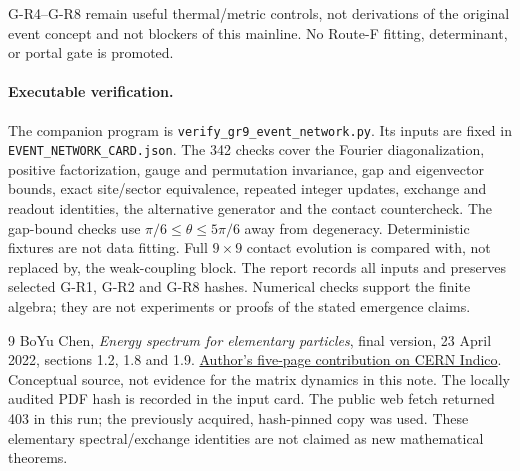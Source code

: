 \documentclass[11pt,a4paper]{article}
\begin{document}
G-R4--G-R8 remain useful thermal/metric controls, not derivations of
the original event concept and not blockers of this mainline. No
Route-F fitting, determinant, or portal gate is promoted.

\paragraph{Executable verification.}
The companion program is
\texttt{verify\_gr9\_event\_network.py}.
Its inputs are fixed in \texttt{EVENT\_NETWORK\_CARD.json}.
The 342 checks cover the Fourier
diagonalization, positive factorization, gauge and permutation invariance,
gap and eigenvector bounds, exact site/sector equivalence, repeated
integer updates, exchange and readout identities, the alternative
generator and the contact countercheck. The gap-bound checks use
$\pi/6\leq\theta\leq5\pi/6$ away from degeneracy. Deterministic fixtures are
not data fitting. Full $9\times9$ contact evolution is compared with,
not replaced by, the weak-coupling block. The report records all inputs
and preserves selected G-R1, G-R2 and G-R8 hashes. Numerical checks
support the finite algebra; they are not experiments or proofs of
the stated emergence claims.

\begin{thebibliography}{9}
 BoYu Chen, \emph{Energy spectrum for elementary particles},
final version, 23 April 2022, sections 1.2, 1.8 and 1.9.
\href{https://indico.cern.ch/event/1109513/contributions/4969967/attachments/2480973/4410560/Energy\%20spectrum\%20for\%20elementary\%20particles_final.pdf}{Author's five-page contribution on CERN Indico}.
Conceptual source, not evidence for the matrix dynamics in this note.
The locally audited PDF hash is recorded in the input card. The public
web fetch returned 403 in this run; the previously acquired, hash-pinned
copy was used. These elementary spectral/exchange identities are not
claimed as new mathematical theorems.
\end{thebibliography}
\end{document}
